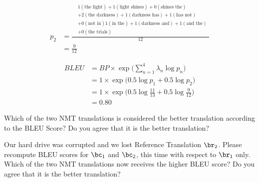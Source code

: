 {\begin{parts}
\begin{subparts}
{        \begin{align*}
            p_2 &= \frac{\begin{aligned}
                &1 (\text{the light}) + 1 (\text{light shines}) + 0 (\text{shines the}) \\
                &+ 2 (\text{the darkness}) + 1 (\text{darkness has}) + 1 (\text{has not}) \\
                &+ 0 (\text{not in}) 1 (\text{in the}) + 1 (\text{darkness and}) + 1 (\text{and the}) \\
                &+ 0 (\text{the trials})
              \end{aligned}}{12} \\
            &= \frac{9}{12}
        \end{align*}

        \begin{align*}
            BLEU &= BP \times \exp \Big( \sum_{n=1}^4 \lambda_n \log p_n \Big) \\
            &= 1 \times \exp \Big( 0.5 \log p_1 + 0.5 \log p_2\Big) \\
            &= 1 \times \exp \Big( 0.5 \log \frac{11}{13} + 0.5 \log \frac{9}{12} \Big) \\
            &= 0.80
        \end{align*}
        
        }
        
        Which of the two NMT translations is considered the better translation according to the BLEU Score? Do you agree that it is the better translation?

        
        \subpart[5] Our hard drive was corrupted and we lost Reference Translation $\br_2$. Please recompute BLEU scores for $\bc_1$ and $\bc_2$, this time with respect to $\br_1$ only. Which of the two NMT translations now receives the higher BLEU score? Do you agree that it is the better translation?

\end{subparts}
\end{parts}}
